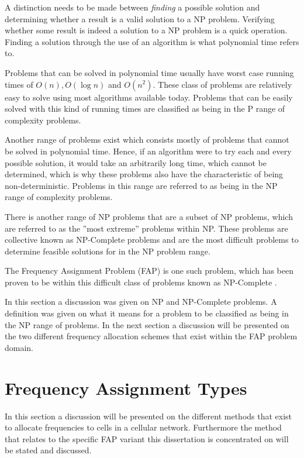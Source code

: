 A distinction needs to be made between \emph{finding} a possible solution and determining whether a result is a valid solution to a NP problem. Verifying whether some result is indeed a solution to a NP problem is a quick operation. Finding a solution through the use of an algorithm is what polynomial time refers to.

Problems that can be solved in polynomial time usually have worst case running times of $O(n),O(\log n)$ and $O(n^2)$. These class of problems are relatively easy to solve using most algorithms available today. Problems that can be easily solved with this kind of running times are classified as being in the P range of complexity problems\cite{AIModernApproach}.

Another range of problems exist which consists mostly of problems that cannot be solved in polynomial time. Hence, if an algorithm were to try each and every possible solution, it would take an arbitrarily long time, which cannot be determined, which is why these problems also have the characteristic of being non-deterministic. Problems in this range are referred to as being in the NP range of complexity problems\cite{AIModernApproach}.

There is another range of NP problems that are a subset of NP problems, which are referred to as the ''most extreme'' problems within NP.  These problems are collective known as NP-Complete problems and are the most difficult problems to determine feasible solutions for in the NP problem range\cite{AIModernApproach}.

The Frequency Assignment Problem (FAP) is one such problem, which has been proven to be within this difficult class of problems known as NP-Complete \cite{MontemanniThesis,Eisenblatter,Karen2004,AndreasPaper,FixedFAPPSO}.

In this section a discussion was given on NP and NP-Complete problems. A definition was given on what it means for a problem to be classified as being in the NP range of problems. In the next section a discussion will be presented on the two different frequency allocation schemes that exist within the FAP problem domain.

\section{Frequency Assignment Types}
\label{sec:FreqAssignmentTypes}
In this section a discussion will be presented on the different methods that exist to allocate frequencies to cells in a cellular network. Furthermore the method that relates to the specific FAP variant this dissertation is concentrated on will be stated and discussed.

